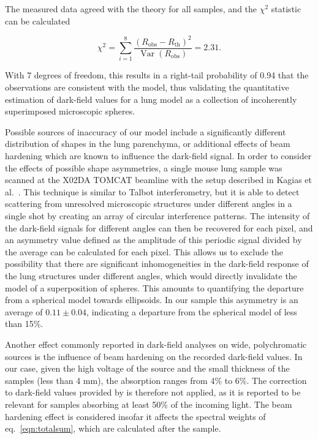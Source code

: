 The measured data agreed with the
theory for all samples, and the $\chi^2$ statistic can be calculated

\begin{equation}
    \chi^2 = \sum_{i=1}^8 \dfrac{(R_{\text{obs}} -
    R_{\text{th}})^2}{\mathop{\mathrm{Var}}(R_{\text{obs}})} = 2.31.
    \label{eqn:chisq}
\end{equation}

With 7 degrees of freedom, this results in a right-tail probability of 0.94 that the 
observations are consistent with the model, thus validating the quantitative estimation of
dark-field values for a lung model as a collection of incoherently
superimposed microscopic spheres.

Possible sources of inaccuracy of our model include a significantly
different distribution of shapes in the lung parenchyma, or additional
effects of beam hardening which are known to influence the dark-field
signal. In order to consider the effects of possible shape asymmetries, a
single mouse lung sample was scanned at the X02DA TOMCAT beamline with the
setup described in Kagias et al.~\parencite{PhysRevLett.116.093902}. This
technique is similar to Talbot interferometry, but it is able to detect
scattering from unresolved microscopic structures under different angles in
a single shot by
creating an array of circular interference patterns. The intensity of the
dark-field signals for different angles can then be recovered for each
pixel, and an asymmetry value defined as the amplitude of this periodic
signal divided by the average can be calculated for each pixel. This allows
us to exclude the possibility that there are significant inhomogeneities in
the dark-field response of the lung structures under different angles, which
would directly invalidate the model of a superposition of spheres. This
amounts to quantifying the departure from a spherical model towards
ellipsoids. In our sample this asymmetry is an average of $0.11 \pm 0.04$, indicating a departure from the spherical model of less than 15\%.

Another effect commonly reported in dark-field analyses on wide, polychromatic
sources is the influence of beam hardening on the recorded dark-field
values. In our case, given the high voltage of the source and the small
thickness of the samples (less than 4 mm), the absorption ranges from 4\% to
6\%. The correction to dark-field values provided by is therefore
not applied, as it is reported to be relevant for samples absorbing at least
50\% of the incoming light. The beam hardening effect is considered insofar
it affects the spectral weights of eq.~\ref{eqn:totalsum}, which are calculated
after the sample. 

